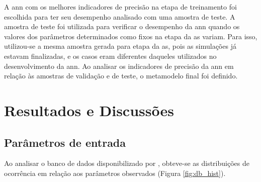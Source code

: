 \documentclass[brazil,hardcopy,openany]{ufscthesis} %
\begin{document}
A \acrshort{ann} com os melhores indicadores de precisão na etapa de treinamento foi escolhida para ter seu desempenho analisado com uma amostra de teste. 
A amostra de teste foi utilizada para verificar o desempenho da \acrshort{ann} quando os valores dos parâmetros determinados como fixos na etapa da \acrshort{as} variam. Para isso, utilizou-se a mesma amostra gerada para etapa da \acrshort{as}, pois as simulações já estavam finalizadas, e os casos eram diferentes daqueles utilizados no desenvolvimento da \acrshort{ann}.
Ao analisar os indicadores de precisão da \acrshort{ann} em relação às amostras de validação e de teste, o metamodelo final foi definido.

\chapter{Resultados e Discussões}
\label{chapter:Resultados}

\section{Parâmetros de entrada} \label{section:parametrosdeentrada}
Ao analisar o banco de dados disponibilizado por , obteve-se as distribuições de ocorrência em relação aos parâmetros observados (Figura \ref{fig:db_hist}).
\end{document}
